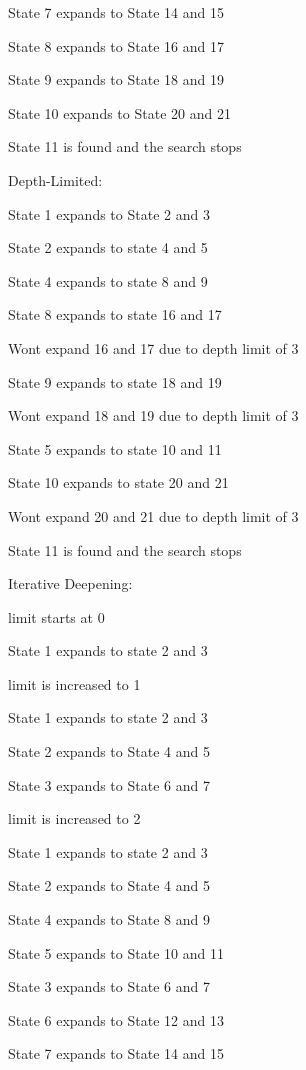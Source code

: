 \documentclass{article}
\begin{document}
State 7 expands to State 14 and 15

State 8 expands to State 16 and 17

State 9 expands to State 18 and 19

State 10 expands to State 20 and 21

State 11 is found and the search stops

\hspace{5mm}

Depth-Limited:

State 1 expands to State 2 and 3

State 2 expands to state 4 and 5

State 4 expands to state 8 and 9

State 8 expands to state 16 and 17

Wont expand 16 and 17 due to depth limit of 3

State 9 expands to state 18 and 19

Wont expand 18 and 19 due to depth limit of 3

State 5 expands to state 10 and 11

State 10 expands to state 20 and 21

Wont expand 20 and 21 due to depth limit of 3

State 11 is found and the search stops

\hspace{5mm}

Iterative Deepening:

limit starts at 0

State 1 expands to state 2 and 3
\newline

limit is increased to 1

State 1 expands to state 2 and 3

State 2 expands to State 4 and 5

State 3 expands to State 6 and 7
\newline

limit is increased to 2

State 1 expands to state 2 and 3

State 2 expands to State 4 and 5

State 4 expands to State 8 and 9

State 5 expands to State 10 and 11

State 3 expands to State 6 and 7

State 6 expands to State 12 and 13

State 7 expands to State 14 and 15
\newline
\end{document}
